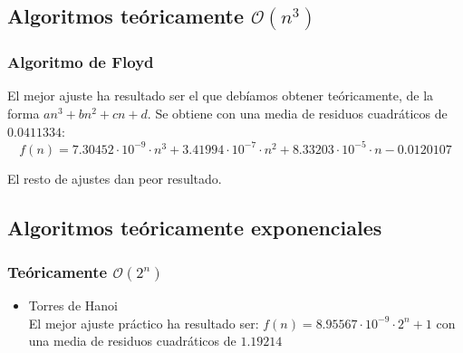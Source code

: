 \documentclass[a4paper, 11pt]{article} %
\begin{document}
\subsection{Algoritmos teóricamente $\mathcal{O}(n^3)$}
  \subsubsection{Algoritmo de Floyd}
  El mejor ajuste ha resultado ser el que debíamos obtener teóricamente, de la forma $an^3+bn^2+cn+d$.
  Se obtiene con una media de residuos cuadráticos de $0.0411334$:
  $$f(n)=7.30452\cdot 10^{-9} \cdot n^3+3.41994\cdot 10^{-7}\cdot n^2+8.33203 \cdot 10^{-5}\cdot n-0.0120107$$
  
  El resto de ajustes dan peor resultado.
  
    \noindent{}

\subsection{Algoritmos teóricamente exponenciales}
  \subsubsection{Teóricamente $\mathcal{O}(2^n)$}
  \begin{itemize}
   \item Torres de Hanoi\\
     El mejor ajuste práctico ha resultado ser: $f(n)=8.95567\cdot 10^{-9}\cdot 2^n+1$
     con una media de residuos cuadráticos de $1.19214$\\
     
     \noindent{}
    \end{itemize}
\end{document}
